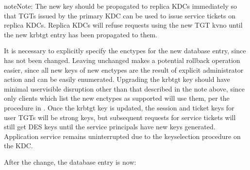 \documentclass[letterpaper,10pt,english]{sphinxmanual}
\begin{document}
\begin{sphinxadmonition}{note}{Note:}
\sphinxAtStartPar
The new  key should be propagated to replica KDCs
immediately so that TGTs issued by the primary KDC can be used to
issue service tickets on replica KDCs.  Replica KDCs will refuse
requests using the new TGT kvno until the new krbtgt entry has
been propagated to them.
\end{sphinxadmonition}

\sphinxAtStartPar
It is necessary to explicitly specify the enctypes for the new database
entry, since  has not been changed.  Leaving
 unchanged makes a potential rollback operation
easier, since all new keys of new enctypes are the result of explicit
administrator action and can be easily enumerated.
Upgrading the krbtgt key should have minimal user\sphinxhyphen{}visible disruption other
than that described in the note above, since only clients which list the
new enctypes as supported will use them, per the procedure
in {\hyperref[\detokenize{admin/enctypes:session-key-selection}]{}}.
Once the krbtgt key is updated, the session and ticket keys for user
TGTs will be strong keys, but subsequent requests
for service tickets will still get DES keys until the service principals
have new keys generated.  Application service
remains uninterrupted due to the key\sphinxhyphen{}selection procedure on the KDC.

\sphinxAtStartPar
After the change, the database entry is now:

\begin{sphinxVerbatim}[commandchars=\\\{\}]
\PYG{p}{[} \PYG{p}{]}
\PYG{p}{[}\PYG{p}{]}
   
   
   
   
   
   
\PYG{p}{[}\PYG{p}{]}
\end{sphinxVerbatim}
\end{document}
